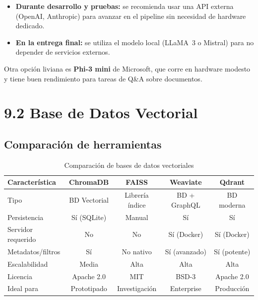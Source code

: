\documentclass[12pt, a4paper]{report}
\begin{document}
\begin{itemize}
  \item \textbf{Durante desarrollo y pruebas:} se recomienda usar una API externa
    (OpenAI, Anthropic) para avanzar en el pipeline sin necesidad de hardware dedicado.
  \item \textbf{En la entrega final:} se utiliza el modelo local (LLaMA~3 o Mistral)
    para no depender de servicios externos.
\end{itemize}

Otra opción liviana es \textbf{Phi-3 mini} de Microsoft, que corre en hardware modesto
y tiene buen rendimiento para tareas de Q\&A sobre documentos.

\section*{9.2 Base de Datos Vectorial}

\subsection*{Comparación de herramientas}

\begin{table}[H]
  \centering
  \small
  \begin{tabular}{lcccc}
    \toprule
    \textbf{Característica} & \textbf{ChromaDB} & \textbf{FAISS} & \textbf{Weaviate} & \textbf{Qdrant} \\
    \midrule
    Tipo              & BD Vectorial   & Librería índice & BD + GraphQL & BD moderna \\
    Persistencia      & Sí (SQLite)    & Manual          & Sí           & Sí \\
    Servidor requerido & No            & No              & Sí (Docker)  & Sí (Docker) \\
    Metadatos/filtros & Sí            & No nativo       & Sí (avanzado)& Sí (potente) \\
    Escalabilidad     & Media          & Alta            & Alta         & Alta \\
    Licencia          & Apache 2.0     & MIT             & BSD-3        & Apache 2.0 \\
    Ideal para        & Prototipado    & Investigación   & Enterprise   & Producción \\
    \bottomrule
  \end{tabular}
  \caption{Comparación de bases de datos vectoriales}
\end{table}
\end{document}
